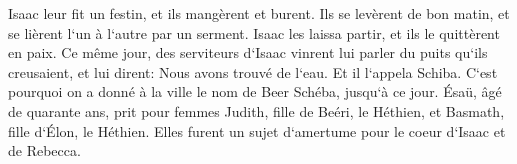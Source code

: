 \verse Isaac leur fit un festin, et ils mangèrent et burent. 
\verse Ils se levèrent de bon matin, et se lièrent l`un à l`autre par un serment. Isaac les laissa partir, et ils le quittèrent en paix. 
\verse Ce même jour, des serviteurs d`Isaac vinrent lui parler du puits qu`ils creusaient, et lui dirent: Nous avons trouvé de l`eau. 
\verse Et il l`appela Schiba. C`est pourquoi on a donné à la ville le nom de Beer Schéba, jusqu`à ce jour. 
\verse Ésaü, âgé de quarante ans, prit pour femmes Judith, fille de Beéri, le Héthien, et Basmath, fille d`Élon, le Héthien. 
\verse Elles furent un sujet d`amertume pour le coeur d`Isaac et de Rebecca. 


